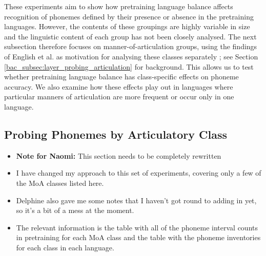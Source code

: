 
These experiments aim to show how pretraining language balance affects recognition of phonemes defined by their presence or absence in the pretraining languages. However, the contents of these groupings are highly variable in size and the linguistic content of each group has not been closely analysed. The next subsection therefore focuses on manner-of-articulation groups, using the findings of English et al. as motivation for analysing these classes separately \cite{english2022domain}; see Section \ref{bac_subsec:layer_probing_articulation} for background. This allows us to test whether pretraining language balance has class-specific effects on phoneme accuracy. We also examine how these effects play out in languages where particular manners of articulation are more frequent or occur only in one language.%



\subsection{Probing Phonemes by Articulatory Class}\label{er_subsec:moa_classes}

\begin{itemize}
    \item \textbf{Note for Naomi:} This section needs to be completely rewritten
    \item I have changed my approach to this set of experiments, covering only a few of the MoA classes listed here.
    \item Delphine also gave me some notes that I haven't got round to adding in yet, so it's a bit of a mess at the moment.
    \item The relevant information is the table with all of the phoneme interval counts in pretraining for each MoA class and the table with the phoneme inventories for each class in each language.
\end{itemize}

